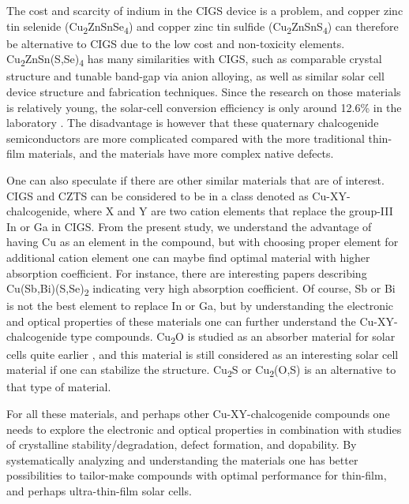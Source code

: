 \documentclass[a4paper, 12pt, titlepage,oneside,drop]{kthesis}
\begin{document}
The cost and scarcity of indium in the CIGS device is a problem, and  copper zinc tin selenide 
(Cu\textsubscript{2}ZnSnSe\textsubscript{4}) and
copper zinc tin sulfide (Cu\textsubscript{2}ZnSnS\textsubscript{4}) 
can therefore be alternative to CIGS due to the low cost and non-toxicity elements. 
Cu\textsubscript{2}ZnSn(S,Se)\textsubscript{4} has many similarities with CIGS, such as comparable crystal structure and 
tunable band-gap via anion alloying, as well as similar solar cell device structure and fabrication techniques. 
Since the research on those materials is relatively young, the solar-cell conversion efficiency
is only around 12.6\% in the laboratory \cite{wang2014device}. The disadvantage is however that  these quaternary 
chalcogenide semiconductors are more complicated compared with the more traditional thin-film materials, 
and the materials have more complex native defects. 

One can also speculate if there are other similar materials that are of interest. CIGS and CZTS can be 
considered to be in a class denoted as Cu-XY-chalcogenide, where X and Y are two cation elements that replace the 
group-III In or Ga in CIGS. From the present study, we understand the advantage of having Cu as an element in the 
compound, but with choosing proper element for additional cation element one can maybe find optimal material 
with higher absorption coefficient.  
For instance, there are interesting papers describing Cu(Sb,Bi)(S,Se)\textsubscript{2} indicating very high absorption coefficient. 
Of course, Sb or Bi is not the best element to replace In or Ga, but by understanding the electronic and optical 
properties of these materials one can further understand the Cu-XY-chalcogenide type compounds.    
Cu\textsubscript{2}O is studied as an absorber material for solar cells quite earlier \cite{RevModPhys5141}, and this material is still considered as an interesting solar cell material if one can stabilize the structure.
Cu\textsubscript{2}S or Cu\textsubscript{2}(O,S) is an alternative to that type of material.

For all these materials, and perhaps other Cu-XY-chalcogenide compounds one needs to explore the electronic and optical properties in combination with studies of crystalline stability/degradation, defect formation, and dopability. 
By systematically analyzing and understanding the materials one has better possibilities to tailor-make compounds with optimal performance for thin-film, and perhaps ultra-thin-film solar cells.
\end{document}
